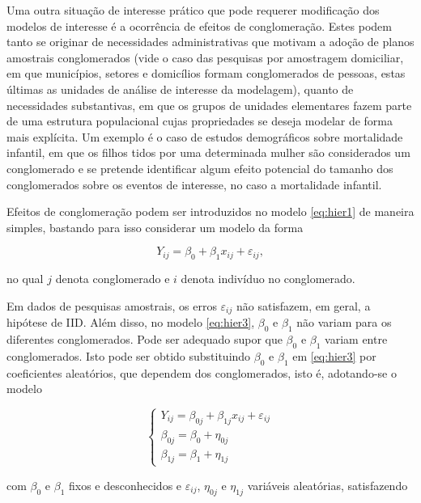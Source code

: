 \documentclass[]{book}
\theoremstyle{definition}
\theoremstyle{definition}
\theoremstyle{definition}
\theoremstyle{remark}
\begin{document}
Uma outra situação de interesse prático que pode requerer modificação
dos modelos de interesse é a ocorrência de efeitos de conglomeração.
Estes podem tanto se originar de necessidades administrativas que
motivam a adoção de planos amostrais conglomerados (vide o caso das
pesquisas por amostragem domiciliar, em que municípios, setores e
domicílios formam conglomerados de pessoas, estas últimas as unidades de
análise de interesse da modelagem), quanto de necessidades substantivas,
em que os grupos de unidades elementares fazem parte de uma estrutura
populacional cujas propriedades se deseja modelar de forma mais
explícita. Um exemplo é o caso de estudos demográficos sobre mortalidade
infantil, em que os filhos tidos por uma determinada mulher são
considerados um conglomerado e se pretende identificar algum efeito
potencial do tamanho dos conglomerados sobre os eventos de interesse, no
caso a mortalidade infantil.

Efeitos de conglomeração podem ser introduzidos no modelo \eqref{eq:hier1}
de maneira simples, bastando para isso considerar um modelo da forma

\begin{equation}
Y_{ij}=\beta _{0}+\beta _{1}x_{ij}+\varepsilon _{ij}, \label{eq:hier3}
\end{equation}

no qual \(j\) denota conglomerado e \(i\) denota indivíduo no
conglomerado.

Em dados de pesquisas amostrais, os erros \(\varepsilon _{ij}\) não
satisfazem, em geral, a hipótese de IID. Além disso, no modelo
\eqref{eq:hier3}, \(\beta _{0}\) e \(\beta _{1}\) não variam para os
diferentes conglomerados. Pode ser adequado supor que \(\beta _{0}\) e
\(\beta _{1}\) variam entre conglomerados. Isto pode ser obtido
substituindo \(\beta _{0}\) e \(\beta _{1}\) em \eqref{eq:hier3} por
coeficientes aleatórios, que dependem dos conglomerados, isto é,
adotando-se o modelo

\begin{equation}
\left\{ 
\begin{array}{l}
Y_{ij}=\beta _{0j}+\beta _{1j}x_{ij}+\varepsilon _{ij} \\ 
\beta _{0j}=\beta _{0}+\eta _{0j} \\ 
\beta _{1j}=\beta _{1}+\eta _{1j}
\end{array}
\right.  \label{eq:hier4}
\end{equation}

com \(\beta _{0}\) e \(\beta _{1}\) fixos e desconhecidos e
\(\varepsilon _{ij}\), \(\eta _{0j}\) e \(\eta _{1j}\) variáveis
aleatórias, \allowbreak
satisfazendo
\end{document}
